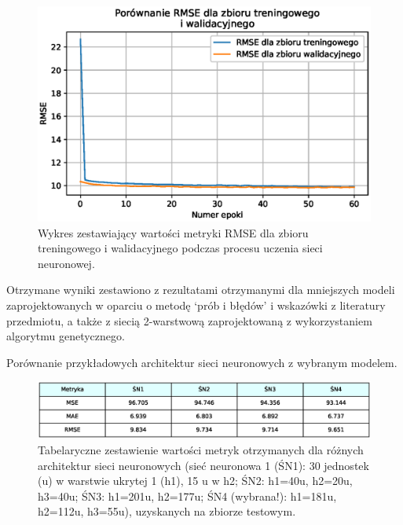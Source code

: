 \documentclass[a4paper,11pt]{article}
\begin{document}
    \begin{figure}[H]
        \label{fig:f_m_rmse_train_valid}
        \centering
        \includegraphics[width=\textwidth]{f_m_rmse_train_valid}
        \caption{Wykres zestawiający wartości metryki RMSE dla zbioru treningowego i walidacyjnego podczas procesu uczenia sieci neuronowej.}
    \end{figure}

    \bigskip

    Otrzymane wyniki zestawiono z rezultatami otrzymanymi dla mniejszych modeli zaprojektowanych w oparciu o metodę `prób i błędów' i wskazówki z literatury przedmiotu, a także z siecią 2-warstwową zaprojektowaną z wykorzystaniem algorytmu genetycznego.

    \bigskip

    Porównanie przykładowych architektur sieci neuronowych z wybranym modelem.

    \begin{figure}[H]
        \label{fig:table_metrics_values_comparison}
        \centering
        \includegraphics[width=\textwidth]{table_metrics_values_comparison}
        \caption{Tabelaryczne zestawienie wartości metryk otrzymanych dla różnych architektur sieci neuronowych (sieć neuronowa 1 (ŚN1): 30 jednostek (u) w warstwie ukrytej 1 (h1), 15 u w h2; ŚN2: h1=40u, h2=20u, h3=40u; ŚN3: h1=201u, h2=177u; ŚN4 (wybrana!): h1=181u, h2=112u, h3=55u), uzyskanych na zbiorze testowym.}
    \end{figure}
\end{document}
